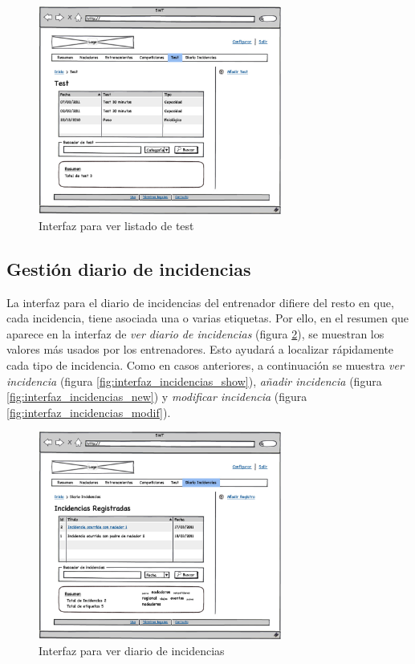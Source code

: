 		\begin{figure}[H]
		  \centering
		    \includegraphics[width=8cm]{./eps/p_interfaz/26_Test.eps}
		  \caption{Interfaz para ver listado de test}
		  \label{fig:interfaz_test}
		\end{figure}
	
	\subsection{Gestión diario de incidencias} %
		\label{sub:interfaz_gestion_diario_de_incidencias}
	
	La interfaz para el diario de incidencias del entrenador difiere del resto en que, cada incidencia, tiene asociada una o varias etiquetas. Por ello, en el resumen que aparece en la interfaz de {\it ver diario de incidencias} (figura \ref{fig:interfaz_incidencias}), se muestran los valores más usados por los entrenadores. Esto ayudará a localizar rápidamente cada tipo de incidencia. Como en casos anteriores, a continuación se muestra {\it ver incidencia} (figura \ref{fig:interfaz_incidencias_show}), {\it añadir incidencia} (figura \ref{fig:interfaz_incidencias_new}) y {\it modificar incidencia} (figura \ref{fig:interfaz_incidencias_modif}).
	
		\begin{figure}[H]
		  \centering
		    \includegraphics[width=8cm]{./eps/p_interfaz/22_Diario.eps}
		  \caption{Interfaz para ver diario de incidencias}
		  \label{fig:interfaz_incidencias}
		\end{figure}

